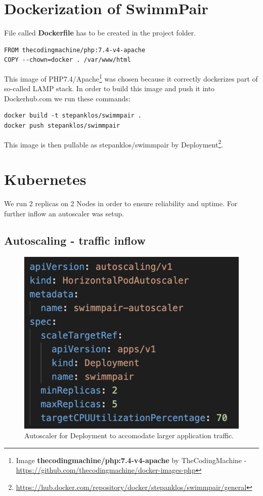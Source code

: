 \section*{Dockerization of SwimmPair}
File called \textbf{Dockerfile} has to be created in the project folder.
\begin{lstlisting}
FROM thecodingmachine/php:7.4-v4-apache
COPY --chown=docker . /var/www/html
\end{lstlisting}
This image of PHP7.4/Apache\footnote{Image \textbf{thecodingmachine/php:7.4-v4-apache}  by TheCodingMachine - \url{https://github.com/thecodingmachine/docker-images-php}} was chosen because it correctly dockerizes part of so-called LAMP stack. In order to build this image and push it into Dockerhub.com we run these commands:
\begin{lstlisting}
docker build -t stepanklos/swimmpair .
docker push stepanklos/swimmpair
\end{lstlisting}
This image is then pullable as stepanklos/swimmpair by Deployment\footnote{\url{https://hub.docker.com/repository/docker/stepanklos/swimmpair/general}}.
\section*{Kubernetes}
We run 2 replicas on 2 Nodes in order to ensure reliability and uptime. For further inflow an autoscaler was setup. 
\subsection*{Autoscaling - traffic inflow}
\begin{figure}[h]
    \centering	
    \includegraphics[scale=0.52]{img/swimmpair_deloyment_k8s_scaling.png}
    \caption{Autoscaler for Deployment to accomodate larger application traffic.}
    \label{fig5.2:k8sautoscaling}
\end{figure}
